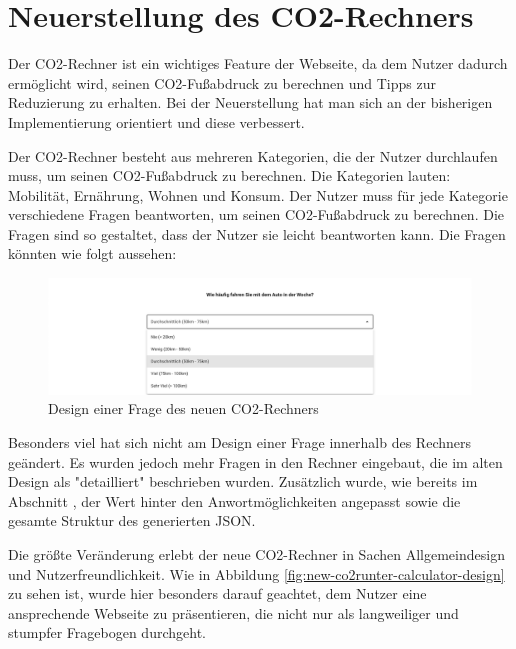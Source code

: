 \section{Neuerstellung des CO2-Rechners}


Der CO2-Rechner ist ein wichtiges Feature der Webseite, da dem Nutzer dadurch ermöglicht wird, seinen CO2-Fußabdruck zu berechnen und Tipps zur Reduzierung zu erhalten.
Bei der Neuerstellung hat man sich an der bisherigen Implementierung orientiert und diese verbessert.

Der CO2-Rechner besteht aus mehreren Kategorien, die der Nutzer durchlaufen muss, um seinen CO2-Fußabdruck zu berechnen.
Die Kategorien lauten: Mobilität, Ernährung, Wohnen und Konsum.
Der Nutzer muss für jede Kategorie verschiedene Fragen beantworten, um seinen CO2-Fußabdruck zu berechnen.
Die Fragen sind so gestaltet, dass der Nutzer sie leicht beantworten kann.
Die Fragen könnten wie folgt aussehen:

\begin{figure}[H]
    \centering
    \includegraphics[width=1\textwidth]{images/06/Question_New_Design.png}
    \caption{Design einer Frage des neuen CO2-Rechners}
    \label{fig:new-co2runter-question-design}
\end{figure}

Besonders viel hat sich nicht am Design einer Frage innerhalb des Rechners geändert.
Es wurden jedoch mehr Fragen in den Rechner eingebaut, die im alten Design als "detailliert" beschrieben wurden.
Zusätzlich wurde, wie bereits im Abschnitt
, der Wert hinter den Anwortmöglichkeiten angepasst sowie die gesamte Struktur des generierten JSON.

Die größte Veränderung erlebt der neue CO2-Rechner in Sachen Allgemeindesign und Nutzerfreundlichkeit.
Wie in Abbildung \ref{fig:new-co2runter-calculator-design} zu sehen ist, wurde hier besonders darauf geachtet, dem Nutzer eine ansprechende Webseite zu präsentieren, die nicht nur als langweiliger und stumpfer Fragebogen durchgeht.

